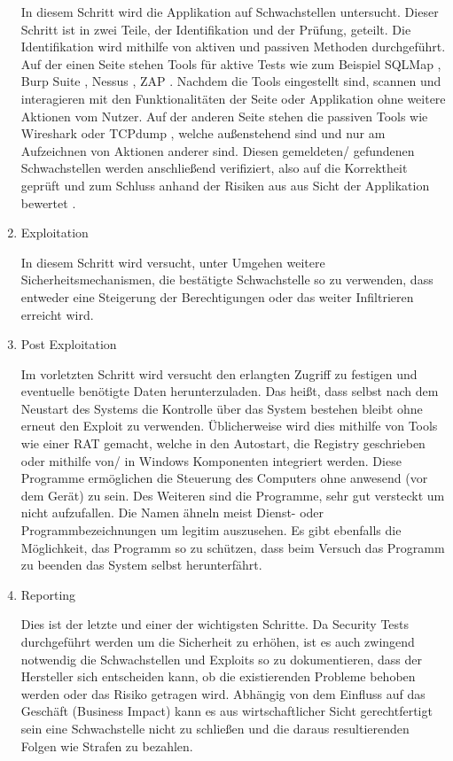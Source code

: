 \begin{enumerate}
        In diesem Schritt wird die Applikation auf Schwachstellen untersucht. 
        Dieser Schritt ist in zwei Teile, der Identifikation und der Prüfung, geteilt.
        Die Identifikation wird mithilfe von aktiven und passiven Methoden durchgeführt.
        Auf der einen Seite stehen Tools für aktive Tests wie zum Beispiel 
        SQLMap \cite{damele_stampar_2014}, 
        Burp Suite \cite{LozanoCarlosA.author2019Hapt}, %
        Nessus \cite{BealeJay2008Nna}, %
        \ac{ZAP} \cite{bennetts2013owasp}. %
        Nachdem die Tools eingestellt sind, scannen und interagieren mit den Funktionalitäten der Seite oder Applikation ohne weitere Aktionen vom Nutzer.
        Auf der anderen Seite stehen die passiven Tools wie Wireshark oder TCPdump \cite{tcpdump_2010}, welche außenstehend sind und nur am Aufzeichnen von Aktionen anderer sind. 
        Diesen gemeldeten/ gefundenen Schwachstellen werden anschließend verifiziert, also auf die Korrektheit geprüft und zum Schluss anhand der Risiken aus aus Sicht der Applikation bewertet \cite{hayes_2012}.
        \item \glqq Exploitation\grqq{}
        
        In diesem Schritt wird versucht, unter Umgehen weitere Sicherheitsmechanismen, die bestätigte Schwachstelle so zu verwenden, dass entweder eine Steigerung der Berechtigungen oder das weiter Infiltrieren erreicht wird.
        \item \glqq Post Exploitation\grqq{}
        
        Im vorletzten Schritt wird versucht den erlangten Zugriff zu festigen und eventuelle benötigte Daten herunterzuladen. Das heißt, dass selbst nach dem Neustart des Systems die Kontrolle über das System bestehen bleibt ohne erneut den Exploit zu verwenden. Üblicherweise wird dies mithilfe von Tools wie einer \ac{RAT} gemacht, welche in den Autostart, die Registry geschrieben oder mithilfe von/ in Windows Komponenten integriert werden.
        Diese Programme ermöglichen die Steuerung des Computers ohne anwesend (vor dem Gerät) zu sein. Des Weiteren sind die Programme, sehr gut versteckt um nicht aufzufallen. Die Namen ähneln meist Dienst- oder Programmbezeichnungen um legitim auszusehen. Es gibt ebenfalls die Möglichkeit, das Programm so zu schützen, dass beim Versuch das Programm zu beenden das System selbst herunterfährt.
        \item \glqq Reporting\grqq{}
        
        Dies ist der letzte und einer der wichtigsten Schritte. Da Security Tests durchgeführt werden um die Sicherheit zu erhöhen, ist es auch zwingend notwendig die Schwachstellen und Exploits so zu dokumentieren, dass der Hersteller sich entscheiden kann, ob die existierenden Probleme behoben werden oder das Risiko getragen wird. Abhängig von dem Einfluss auf das Geschäft (Business Impact) kann es aus wirtschaftlicher Sicht gerechtfertigt sein eine Schwachstelle nicht zu schließen und die daraus resultierenden Folgen wie Strafen zu bezahlen.
    \end{enumerate}
